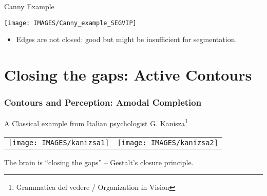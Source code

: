 \documentclass[9pt]{beamer}
\newcommand{\myemph}[1]{{\color{blue}{#1}}}
\begin{document}


\begin{frame}{Canny Example}
  \begin{center}
	\texttt{[image: IMAGES/Canny\_example\_SEGVIP]}
  \end{center}
  \begin{itemize}
  \item Edges are not closed: good but might be insufficient for segmentation.
  \end{itemize}
\end{frame}



\section{Closing the gaps: Active Contours}


\begin{frame}
  \frametitle{Contours and Perception: Amodal Completion }
   A Classical example from Italian psychologist G. Kanisza\footnote{Grammatica del vedere / Organization in Vision}
   \begin{center}
     \begin{tabular}[h]{cc}
        \texttt{[image: IMAGES/kanizsa1]} &
      \texttt{[image: IMAGES/kanizsa2]} \\
     \end{tabular}
   \end{center}
   The brain is ``closing the gaps'' -- Gestalt's closure principle.
\end{frame}
\end{document}
